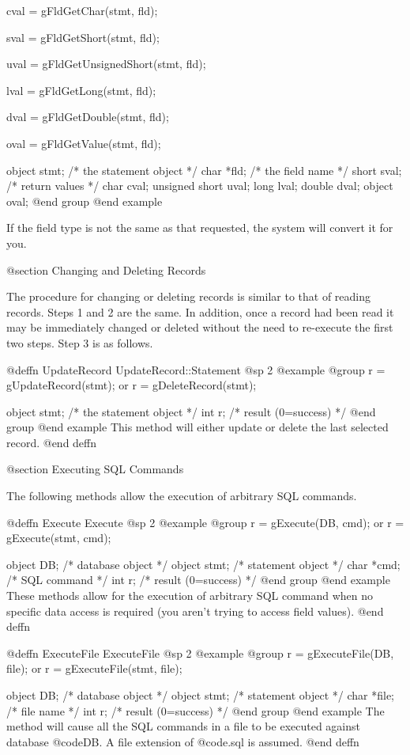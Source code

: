 cval = gFldGetChar(stmt, fld);

sval = gFldGetShort(stmt, fld);

uval = gFldGetUnsignedShort(stmt, fld);

lval = gFldGetLong(stmt, fld);

dval = gFldGetDouble(stmt, fld);

oval = gFldGetValue(stmt, fld);

object  stmt;   /*  the statement object  */
char    *fld;   /*  the field name        */
short   sval;   /*  return values         */
char    cval;
unsigned short uval;
long    lval;
double  dval;
object  oval;
@end group
@end example

If the field type is not the same as that requested, the system will
convert it for you.


@section Changing and Deleting Records

The procedure for changing or deleting records is similar to that of
reading records.  Steps 1 and 2 are the same.  In addition, once a
record had been read it may be immediately changed or deleted without the
need to re-execute the first two steps.  Step 3 is as follows.

@deffn {UpdateRecord}  UpdateRecord::Statement
@sp 2
@example
@group
r = gUpdateRecord(stmt);
        or
r = gDeleteRecord(stmt);

object  stmt;   /*  the statement object  */
int     r;      /*  result (0=success)    */
@end group
@end example
This method will either update or delete the last selected record.
@end deffn


@section Executing SQL Commands

The following methods allow the execution of arbitrary SQL commands.

@deffn {Execute}  Execute
@sp 2
@example
@group
r = gExecute(DB, cmd);
     or
r = gExecute(stmt, cmd);

object  DB;     /*  database object    */
object  stmt;   /*  statement object   */
char    *cmd;   /*  SQL command        */
int     r;      /*  result (0=success) */
@end group
@end example
These methods allow for the execution of arbitrary SQL command when no
specific data access is required (you aren't trying to access field
values).
@end deffn


@deffn {ExecuteFile}  ExecuteFile
@sp 2
@example
@group
r = gExecuteFile(DB, file);
       or
r = gExecuteFile(stmt, file);

object  DB;     /*  database object    */
object  stmt;   /*  statement object   */
char    *file;  /*  file name          */
int     r;      /*  result (0=success) */
@end group
@end example
The method will cause all the SQL commands in a file to be executed against database @code{DB}.
A file extension of @code{.sql} is assumed.
@end deffn


